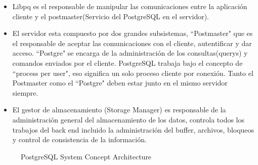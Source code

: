 \begin{itemize}
\item Libpq es el responsable de manipular las comunicaciones entre la aplicaci\'on cliente y el postmaster(Servicio del PostgreSQL en el servidor).
\item El servidor esta compuesto por dos grandes subsistemas, ``Postmaster" que es el responsable de aceptar las comunicaciones con el cliente, autentificar y dar acceso. ``Postgre" se encarga de la administraci\'on de los consultas(querys) y comandos enviados por el cliente. PostgreSQL trabaja bajo el concepto de ``process per user", eso significa un solo proceso cliente por conexi\'on. Tanto el Postmaster como el ``Postgre" deben estar junto en el mismo servidor siempre.
\item El gestor de almacenamiento (Storage Manager) es responsable de la administraci\'on general del almacenamiento de los datos, controla todos los trabajos del back end incluido la administraci\'on del buffer, archivos, bloqueos y control de consistencia de la informaci\'on.   
\end{itemize}
\begin{figure}[H]
\centering
{}
\caption{PostgreSQL System Concept Architecture \cite{postgresqlpordentro}} \label{fig:ArquitecturaPostgres}
\end{figure}

